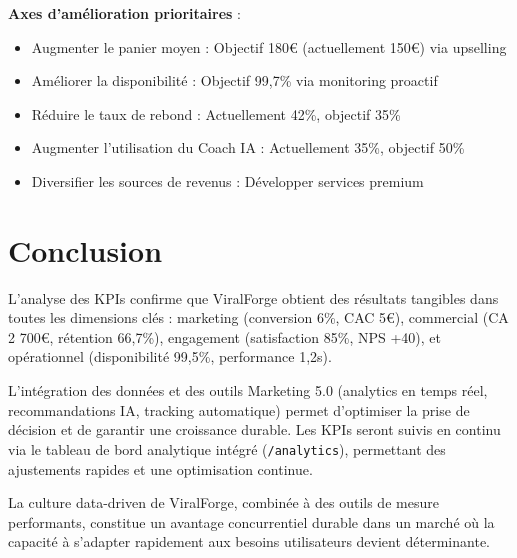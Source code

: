 \textbf{Axes d'amélioration prioritaires} :
\begin{itemize}
    \item Augmenter le panier moyen : Objectif 180€ (actuellement 150€) via upselling
    \item Améliorer la disponibilité : Objectif 99,7\% via monitoring proactif
    \item Réduire le taux de rebond : Actuellement 42\%, objectif 35\%
    \item Augmenter l'utilisation du Coach IA : Actuellement 35\%, objectif 50\%
    \item Diversifier les sources de revenus : Développer services premium
\end{itemize}

\newpage

\section*{Conclusion}

L'analyse des KPIs confirme que ViralForge obtient des résultats tangibles dans toutes les dimensions clés : marketing (conversion 6\%, CAC 5€), commercial (CA 2 700€, rétention 66,7\%), engagement (satisfaction 85\%, NPS +40), et opérationnel (disponibilité 99,5\%, performance 1,2s).

L'intégration des données et des outils Marketing 5.0 (analytics en temps réel, recommandations IA, tracking automatique) permet d'optimiser la prise de décision et de garantir une croissance durable. Les KPIs seront suivis en continu via le tableau de bord analytique intégré (\texttt{/analytics}), permettant des ajustements rapides et une optimisation continue.

La culture data-driven de ViralForge, combinée à des outils de mesure performants, constitue un avantage concurrentiel durable dans un marché où la capacité à s'adapter rapidement aux besoins utilisateurs devient déterminante.
